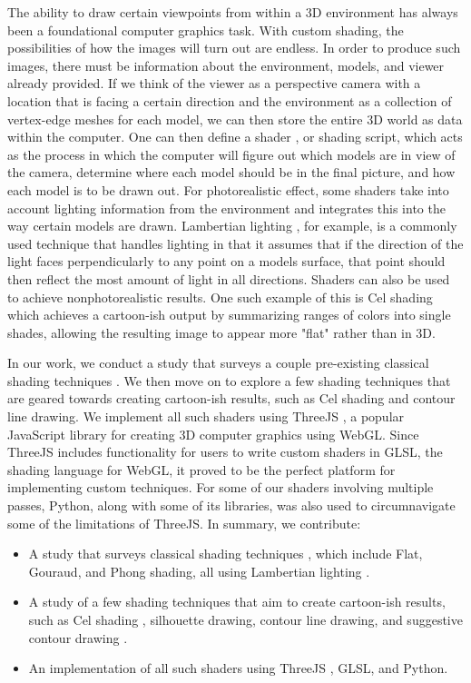 \documentclass[10pt,twocolumn,letterpaper]{article}
\begin{document}
The ability to draw certain viewpoints from within a 3D environment has always been a foundational computer graphics task. With custom shading, the possibilities of how the images will turn out are endless. In order to produce such images, there must be information about the environment, models, and viewer already provided. If we think of the viewer as a perspective camera with a location that is facing a certain direction and the environment as a collection of vertex-edge meshes for each model, we can then store the entire 3D world as data within the computer. One can then define a shader \cite{wiki:Shader}, or shading script, which acts as the process in which the computer will figure out which models are in view of the camera, determine where each model should be in the final picture, and how each model is to be drawn out. For photorealistic effect, some shaders take into account lighting information from the environment and integrates this into the way certain models are drawn. Lambertian lighting \cite{wiki:Lambertian_reflectance}, for example, is a commonly used technique that handles lighting in that it assumes that if the direction of the light faces perpendicularly to any point on a models surface, that point should then reflect the most amount of light in all directions. Shaders \cite{wiki:Shader} can also be used to achieve nonphotorealistic results. One such example of this is Cel shading \cite{wiki:Cel_shading} which achieves a cartoon-ish output by summarizing ranges of colors into single shades, allowing the resulting image to appear more "flat" rather than in 3D.

In our work, we conduct a study that surveys a couple pre-existing classical shading techniques \cite{wiki:List_of_common_shading_algorithms}. We then move on to explore a few shading techniques that are geared towards creating cartoon-ish results, such as Cel shading \cite{wiki:Cel_shading} and contour line drawing. We implement all such shaders using ThreeJS \cite{wiki:Three.js}, a popular JavaScript library for creating 3D computer graphics using WebGL. Since ThreeJS includes functionality for users to write custom shaders in GLSL, the shading language for WebGL, it proved to be the perfect platform for implementing custom techniques. For some of our shaders involving multiple passes, Python, along with some of its libraries, was also used to circumnavigate some of the limitations of ThreeJS. In summary, we contribute:
\begin{itemize}
    \item A study that surveys classical shading techniques \cite{wiki:List_of_common_shading_algorithms}, which include Flat, Gouraud, and Phong shading, all using Lambertian lighting \cite{wiki:Lambertian_reflectance}.
    \item A study of a few shading techniques that aim to create cartoon-ish results, such as Cel shading \cite{wiki:Cel_shading}, silhouette drawing, contour line drawing, and suggestive contour drawing \cite{DeCarlo:2003:SCF}.
    \item An implementation of all such shaders using ThreeJS \cite{wiki:Three.js}, GLSL, and Python.
\end{itemize}
\end{document}
